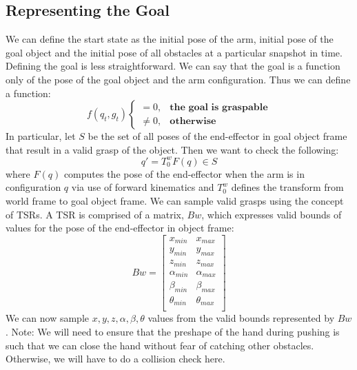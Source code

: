 \documentclass[11pt, oneside]{article}   	%
\begin{document}
\subsection{Representing the Goal}\label{sec:graspability}
We can define the start state as the initial pose of the arm, initial pose of the goal object and the initial pose of all obstacles at a particular snapshot in time.  Defining the goal is less straightforward.  We can say that the goal is a function only of the pose of the goal object and the arm configuration.  Thus we can define a function:
\[ f(q_t, g_t) 
\begin{cases}
=0, & \textbf{the goal is graspable} \\
\neq 0, & \textbf{otherwise} 
\end{cases}
\]
In particular, let $S$ be the set of all poses of the end-effector in goal object frame that result in a valid grasp of the object. 
Then we want to check the following:
\[ q' = T^w_0F(q) \in S \]
where $F(q)$ computes the pose of the end-effector when the arm is in configuration $q$ via use of forward kinematics and $T_0^w$ defines the transform from world frame to goal object frame.
\newline\newline
We can sample valid grasps using the concept of TSRs.  A TSR is comprised of a matrix, $Bw$, which expresses valid bounds of values for the pose of the end-effector in object frame:
\[ Bw = \left[ \begin{array}{cc}
x_{min} & x_{max} \\
y_{min} & y_{max} \\
z_{min} & z_{max} \\
\alpha_{min} & \alpha_{max} \\
\beta_{min} & \beta_{max} \\
\theta_{min} & \theta_{max} \\
\end{array}\right] \]
We can now sample $x, y, z, \alpha, \beta, \theta$ values from the valid bounds represented by $Bw$.  
\newline\newline
Note: We will need to ensure that the preshape of the hand during pushing is such that we can close the hand without fear of catching other obstacles.  Otherwise, we will have to do a collision check here.
\end{document}
